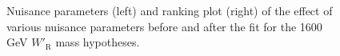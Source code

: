 \begin{figure}[H]
  \centering
  \caption{Nuisance parameters (left) and ranking plot (right) of the effect of various nuisance parameters before and after the fit for the 1600 GeV $W'_{\text{R}}$ mass hypotheses.}
  \label{fig:NuisParAndRanking_WpRH1600}
\end{figure}
